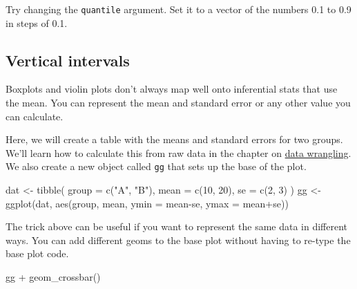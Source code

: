 \documentclass[
  oneside]{book}
\newenvironment{Shaded}{\begin{snugshade}}{\end{snugshade}}
\newcommand{\AttributeTok}[1]{\textcolor[rgb]{0.77,0.63,0.00}{#1}}
\newcommand{\DecValTok}[1]{\textcolor[rgb]{0.00,0.00,0.81}{#1}}
\newcommand{\FunctionTok}[1]{\textcolor[rgb]{0.00,0.00,0.00}{#1}}
\newcommand{\NormalTok}[1]{#1}
\newcommand{\OtherTok}[1]{\textcolor[rgb]{0.56,0.35,0.01}{#1}}
\newcommand{\SpecialCharTok}[1]{\textcolor[rgb]{0.00,0.00,0.00}{#1}}
\newcommand{\StringTok}[1]{\textcolor[rgb]{0.31,0.60,0.02}{#1}}
\begin{document}
\begin{try}
Try changing the \texttt{quantile} argument. Set it to a vector of the numbers 0.1 to 0.9 in steps of 0.1.

\end{try}

\hypertarget{vertical_intervals}{%
\subsection{Vertical intervals}\label{vertical_intervals}}

Boxplots and violin plots don't always map well onto inferential stats that use the mean. You can represent the mean and standard error or any other value you can calculate.

Here, we will create a table with the means and standard errors for two groups. We'll learn how to calculate this from raw data in the chapter on \protect\hyperlink{dplyr}{data wrangling}. We also create a new object called \texttt{gg} that sets up the base of the plot.

\begin{Shaded}
\begin{Highlighting}[]
\NormalTok{dat }\OtherTok{\textless{}{-}} \FunctionTok{tibble}\NormalTok{(}
  \AttributeTok{group =} \FunctionTok{c}\NormalTok{(}\StringTok{"A"}\NormalTok{, }\StringTok{"B"}\NormalTok{),}
  \AttributeTok{mean =} \FunctionTok{c}\NormalTok{(}\DecValTok{10}\NormalTok{, }\DecValTok{20}\NormalTok{),}
  \AttributeTok{se =} \FunctionTok{c}\NormalTok{(}\DecValTok{2}\NormalTok{, }\DecValTok{3}\NormalTok{)}
\NormalTok{)}
\NormalTok{gg }\OtherTok{\textless{}{-}} \FunctionTok{ggplot}\NormalTok{(dat, }\FunctionTok{aes}\NormalTok{(group, mean, }
                      \AttributeTok{ymin =}\NormalTok{ mean}\SpecialCharTok{{-}}\NormalTok{se, }
                      \AttributeTok{ymax =}\NormalTok{ mean}\SpecialCharTok{+}\NormalTok{se))}
\end{Highlighting}
\end{Shaded}

The trick above can be useful if you want to represent the same data in different ways. You can add different geoms to the base plot without having to re-type the base plot code.

\begin{Shaded}
\begin{Highlighting}[]
\NormalTok{gg }\SpecialCharTok{+} \FunctionTok{geom\_crossbar}\NormalTok{()}
\end{Highlighting}
\end{Shaded}
\end{document}
